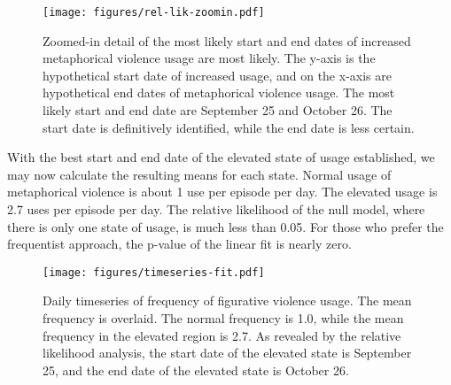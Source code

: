 \begin{figure}[h!]
  \centering
  \texttt{[image: figures/rel-lik-zoomin.pdf]}
  \caption{Zoomed-in detail of the most likely start and end dates of increased
  metaphorical violence usage are most likely. The y-axis is the hypothetical
  start date of increased usage, and on the x-axis are hypothetical end dates 
  of metaphorical violence usage. The most likely start and end date are
  September 25 and October 26. The start date is definitively identified, while
  the end date is less certain.}
  \label{fig:rel-lik-zoomin}
\end{figure}



With the best start and end date of the elevated state of usage established,
we may now calculate the resulting means for each state. Normal usage of 
metaphorical violence is about 1 use per episode per day. The elevated usage 
is 2.7 uses per episode per day. The relative likelihood of the null model,
where there is only one state of usage, is much less than 0.05. For those
who prefer the frequentist approach, the p-value of the linear fit is
nearly zero. 

\begin{figure}
  \centering
  \texttt{[image: figures/timeseries-fit.pdf]}
  \caption{Daily timeseries of frequency of figurative violence usage. The
  mean frequency is overlaid. The normal frequency is 1.0, while the mean
  frequency in the elevated region is 2.7. As revealed by the
  relative likelihood analysis, the start date of the elevated state is 
  September 25, and the end date of the elevated state is October 26.}
  \label{fig:timeseries-fit}
\end{figure}


